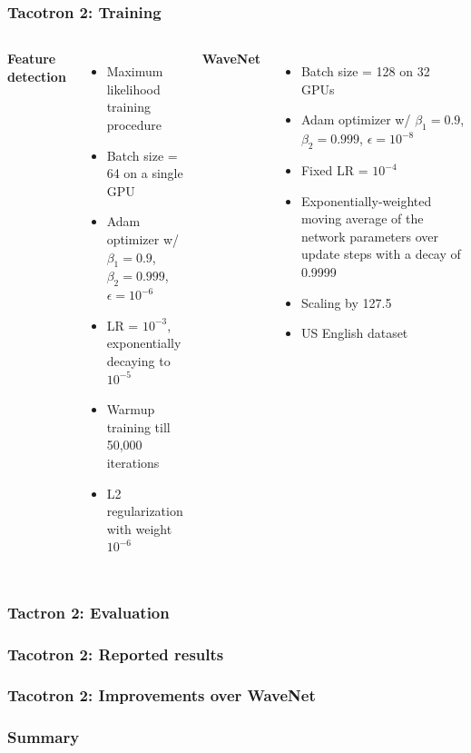 \documentclass{beamer}
\begin{document}
  \begin{frame}
    \frametitle{Tacotron 2: Training}
    \begin{columns}
        \textbf{Feature detection}
        \begin{itemize}
          \item Maximum likelihood training procedure
          \item Batch size = 64 on a single GPU
          \item Adam optimizer w/ $\beta_1=0.9$, $\beta_2=0.999$, $\epsilon=10^{-6}$
          \item LR = $10^{-3}$, exponentially decaying to $10^{-5}$
          \item Warmup training till 50,000 iterations
          \item L2 regularization with weight $10^{-6}$
        \end{itemize}
        \textbf{WaveNet}
        \begin{itemize}
          \item Batch size = 128 on 32 GPUs
          \item Adam optimizer w/ $\beta_1=0.9$, $\beta_2=0.999$, $\epsilon=10^{-8}$
          \item Fixed LR = $10^{-4}$
          \item Exponentially-weighted moving average of the network parameters over update steps with a decay of 0.9999
          \item Scaling by 127.5
          \item US English dataset
        \end{itemize}
    \end{columns}
  \end{frame}

  \begin{frame}
    \frametitle{Tactron 2: Evaluation}
  \end{frame}

  \begin{frame}
    \frametitle{Tacotron 2: Reported results}

  \end{frame}

  \begin{frame}
    \frametitle{Tacotron 2: Improvements over WaveNet}
  \end{frame}

  \begin{frame}
    \frametitle{Summary}
  \end{frame}
  
\end{document}
